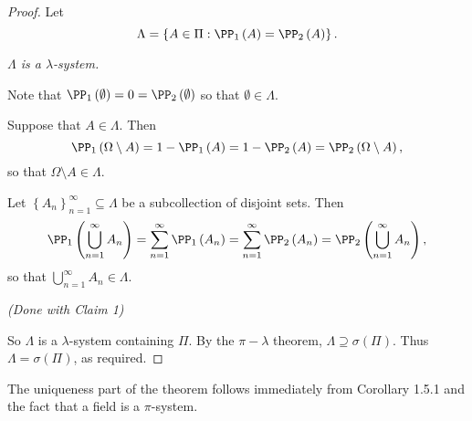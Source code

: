 \documentclass[stat901]{subfiles}
\begin{document}
    \begin{proof}
        Let
        \begin{equation*}
            \Lambda = \left\lbrace A\in\Pi: \PP_1\left( A \right) = \PP_2\left( A \right) \right\rbrace.
        \end{equation*}

        \begin{subproof}[Claim 1]
            \textit{$\Lambda$ is a $\lambda$-system.}

            Note that $\PP_1\left( \emptyset \right) = 0 = \PP_2\left( \emptyset \right)$ so that $\emptyset\in\Lambda$.

            Suppose that $A\in\Lambda$. Then
            \begin{equation*}
                \PP_1\left( \Omega\setminus A \right) = 1-\PP_1\left( A \right) = 1-\PP_2\left( A \right) = \PP_2\left( \Omega\setminus A \right),
            \end{equation*}
            so that $\Omega\setminus A\in\Lambda$.

            Let $\left\lbrace A_n \right\rbrace^{\infty}_{n=1}\subseteq\Lambda$ be a subcollection of disjoint sets. Then
            \begin{equation*}
                \PP_1\left( \bigcup^{\infty}_{n=1}A_n \right) = \sum^{\infty}_{n=1} \PP_1\left( A_n \right) = \sum^{\infty}_{n=1} \PP_2\left( A_n \right) = \PP_2\left( \bigcup^{\infty}_{n=1}A_n \right),
            \end{equation*}
            so that $\bigcup^{\infty}_{n=1}A_n\in\Lambda$.

            \hfill\textit{(Done with Claim 1)}
        \end{subproof}

        So $\Lambda$ is a $\lambda$-system containing $\Pi$. By the $\pi-\lambda$ theorem, $\Lambda\supseteq\sigma\left( \Pi \right)$. Thus $\Lambda = \sigma\left( \Pi \right)$, as required.
    \end{proof}

    \np The uniqueness part of the theorem follows immediately from Corollary 1.5.1 and the fact that a field is a $\pi$-system.
\end{document}
